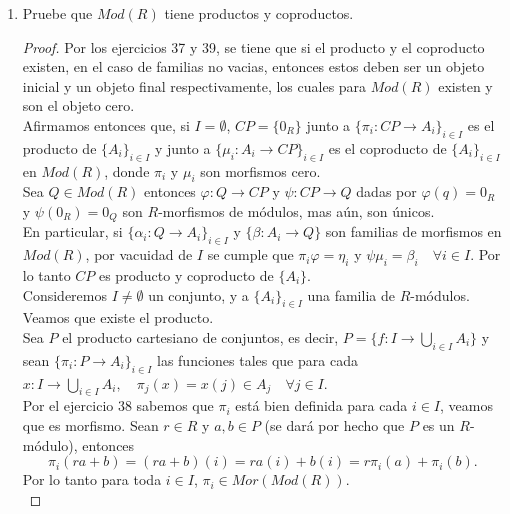 \documentclass{article}
\begin{document}
\begin{enumerate}[label=\textbf{Ej \arabic*.}]
\begin{proof}
			La suficiencia se verifica en forma análoga, puesto que tomar una familia de morfismos en la categoría $\mathscr{C}$ induce una familia de morfismos en $\opst{\mathscr{C}}$, empleando ahora la propiedad universal del producto.\\
		\end{proof}
\item Pruebe que $Mod(R)$ tiene productos y coproductos.
\begin{proof}
Por los ejercicios 37 y 39, se tiene que si el producto y el coproducto existen, en el caso de familias no vacias, entonces estos deben ser un objeto inicial y 
un objeto final respectivamente, los cuales para $Mod(R)$ existen y son el objeto cero.\\

Afirmamos entonces que, si $I=\emptyset$, $CP=\{0_R\}$ junto a $\{\pi_i:CP\to A_i\}_{i\in I}$ es el producto de $\{A_i\}_{i\in I}$ y 
 junto a $\{\mu_i:A_i\to CP\}_{i\in I}$ es el coproducto de $\{A_i\}_{i\in I}$ en $Mod(R)$, donde $\pi_i$ y $\mu_i$ son morfismos cero.\\

Sea $Q\in Mod(R)$ entonces $\varphi:Q\to CP$ y $\psi:CP\to Q$ dadas por 
$\varphi(q)=0_R$ y $\psi(0_R)=0_Q$ son $R$-morfismos de módulos, mas aún, son únicos.\\

En particular, si $\{\alpha_i:Q\to A_i\}_{i\in I}$ y $\{\beta:A_i\to Q\}$ son familias de morfismos en $Mod(R)$, por vacuidad de $I$ se cumple que 
$\pi_i\varphi=\eta_i$ y $\psi\mu_i=\beta_i\quad \forall i\in I$. Por lo tanto $CP$ es producto y coproducto de $\{A_i\}$.\\

Consideremos $I\neq \emptyset$ un conjunto, y a $\{A_i\}_{i\in I}$ una familia de $R$-módulos. Veamos que existe el producto.\\
Sea $P$ el producto cartesiano de conjuntos, es decir, $P=\{f:I\to \displaystyle\bigcup_{i\in I}A_i\}$ y sean $\{\pi_i:P\to A_i\}_{i\in I}$ las funciones
tales que para cada\\ $x:I\to  \displaystyle\bigcup_{i\in I}A_i,\quad \pi_j(x)=x(j)\in A_j\quad \forall j\in I$.\\

Por el ejercicio 38 sabemos que $\pi_i$ está bien definida para cada $i\in I$, veamos que es morfismo. Sean $r\in R$ y $a,b\in P$ (se dará por hecho
que $P$ es un $R$-módulo), entonces 
\[\pi_i(ra+b)=(ra+b)(i)=ra(i)+b(i)=r\pi_i(a)+\pi_i(b).
\]
Por lo tanto para toda $i\in I$, $\pi_i\in Mor(Mod(R))$.\\


\end{proof}
\end{enumerate}
\end{document}
